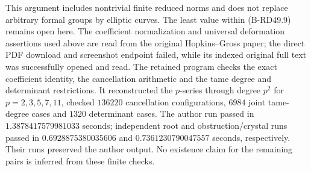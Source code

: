 \begin{remark}
This argument includes nontrivial finite reduced norms and does
not replace arbitrary formal groups by elliptic curves. The
least value within (B-RD49.9) remains open here. The coefficient
normalization and universal deformation assertions used above
are read from the original Hopkins--Gross paper; the direct PDF
download and screenshot endpoint failed, while its indexed
original full text was successfully opened and read.
The retained program 
checks the exact coefficient identity, the cancellation
arithmetic and the tame degree and determinant restrictions.
It reconstructed the $p$-series through degree $p^2$ for
$p=2,3,5,7,11$, checked $136220$ cancellation configurations,
$6984$ joint tame-degree cases and $1320$ determinant cases.
The author run passed in $1.3878417579981033$ seconds; independent
root and obstruction/crystal runs passed in $0.6928875380035606$
and $0.7361230790047557$ seconds, respectively. Their runs preserved
the author output. No existence claim for the remaining pairs is
inferred from these finite checks.
\end{remark}
